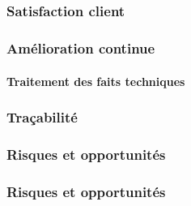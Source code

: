 \speaker{\Pierre}

\subsection{} %

\begin{frame}
\frametitle{Satisfaction client}

\end{frame}


\begin{frame}
\frametitle{Amélioration continue}
\framesubtitle{Traitement des faits techniques}

\end{frame}


\begin{frame}
\frametitle{Traçabilité}

\end{frame}

\speaker{\Kafui}

\begin{frame}
\frametitle{Risques et opportunités}

\end{frame}


\begin{frame}
\frametitle{Risques et opportunités}

\end{frame}




